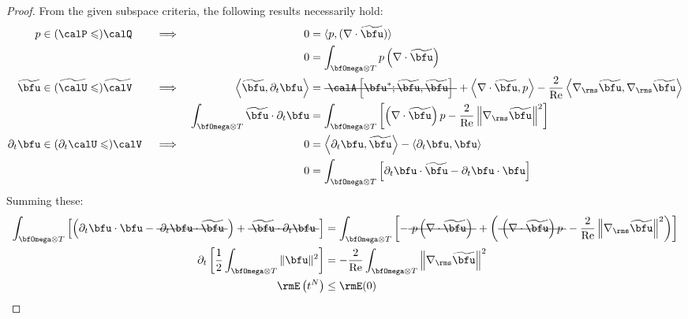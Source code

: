     \begin{proof}
        From the given subspace criteria, the following results necessarily hold:
        \begin{align}
            p                 &\in  (\calP              \leqslant)  \calQ              &&\implies  &                                                              0  &=  \langle p, (\nabla\cdot\widetilde{\bfu})\rangle  \\
            &                                                                          &&          &                                                              0  &=  \int_{\bfOmega\otimes T}p\left(\nabla\cdot\widetilde{\bfu}\right)  \\
            \widetilde{\bfu}  &\in  (\widetilde{\calU}  \leqslant)  \widetilde{\calV}  &&\implies  &    \left\langle\widetilde{\bfu}, \partial_{t}\bfu\right\rangle  &=  \mst{\calA\left[\bfu^{*}; \widetilde{\bfu}, \widetilde{\bfu}\right]} + \left\langle\nabla\cdot\widetilde{\bfu}, p\right\rangle - \frac{2}{\rmRe}\left\langle\nabla_{\rms}\widetilde{\bfu}, \nabla_{\rms}\widetilde{\bfu}\right\rangle  \\
            &                                                                          &&          &  \int_{\bfOmega\otimes T}\widetilde{\bfu}\cdot\partial_{t}\bfu  &=  \int_{\bfOmega\otimes T}\left[\left(\nabla\cdot\widetilde{\bfu}\right)p - \frac{2}{\rmRe}\left\|\nabla_{\rms}\widetilde{\bfu}\right\|^{2}\right]  \\
            \partial_{t}\bfu  &\in  (\partial_{t}\calU  \leqslant)  \calV              &&\implies  &                                                              0  &=  \left\langle\partial_{t}\bfu, \widetilde{\bfu}\right\rangle - \left\langle\partial_{t}\bfu, \bfu\right\rangle  \\
            &                                                                          &&          &                                                              0  &=  \int_{\bfOmega\otimes T}\left[\partial_{t}\bfu\cdot\widetilde{\bfu} - \partial_{t}\bfu\cdot\bfu\right]  \\
        \end{align}
        Summing these:
        \begin{align}
            \int_{\bfOmega\otimes T}\left[\left(\partial_{t}\bfu\cdot\bfu - \mst{\partial_{t}\bfu\cdot\widetilde{\bfu}}\right) + \mst{\widetilde{\bfu}\cdot\partial_{t}\bfu}\right]  &=  \int_{\bfOmega\otimes T}\left[- \mst{p\left(\nabla\cdot\widetilde{\bfu}\right)} + \left(\mst{\left(\nabla\cdot\widetilde{\bfu}\right)p} - \frac{2}{\rmRe}\left\|\nabla_{\rms}\widetilde{\bfu}\right\|^{2}\right)\right]  \\
            \partial_{t}\left[\frac{1}{2}\int_{\bfOmega\otimes T}\|\bfu\|^{2}\right]  &=  - \frac{2}{\rmRe}\int_{\bfOmega\otimes T}\left\|\nabla_{\rms}\widetilde{\bfu}\right\|^{2}  \label{eqn:weak NS dissipation}  \\
            \rmE\left(t^{N}\right)  &\leq  \rmE(0)
        \end{align}
    \end{proof}


